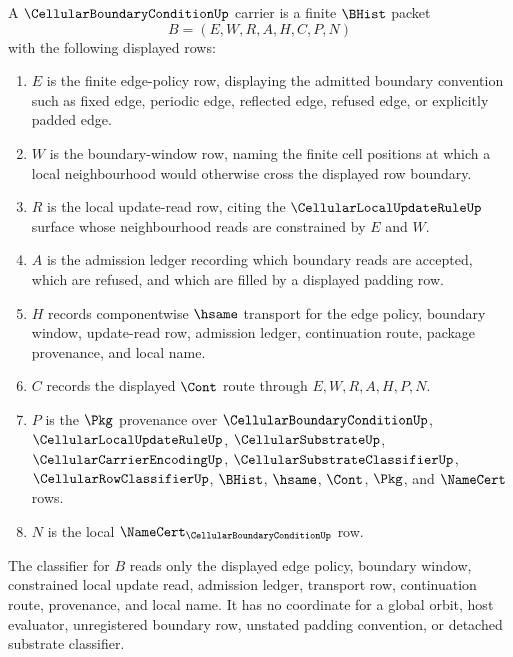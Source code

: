 \begin{definition}
\label{def:cellular-boundary-condition-carrier}
A $\CellularBoundaryConditionUp$ carrier is a finite $\BHist$ packet
$$
B=(E,W,R,A,H,C,P,N)
$$
with the following displayed rows:
\begin{enumerate}
\item $E$ is the finite edge-policy row, displaying the admitted boundary convention such as fixed edge, periodic edge, reflected edge, refused edge, or explicitly padded edge.
\item $W$ is the boundary-window row, naming the finite cell positions at which a local neighbourhood would otherwise cross the displayed row boundary.
\item $R$ is the local update-read row, citing the $\CellularLocalUpdateRuleUp$ surface whose neighbourhood reads are constrained by $E$ and $W$.
\item $A$ is the admission ledger recording which boundary reads are accepted, which are refused, and which are filled by a displayed padding row.
\item $H$ records componentwise $\hsame$ transport for the edge policy, boundary window, update-read row, admission ledger, continuation route, package provenance, and local name.
\item $C$ records the displayed $\Cont$ route through $E,W,R,A,H,P,N$.
\item $P$ is the $\Pkg$ provenance over $\CellularBoundaryConditionUp$, $\CellularLocalUpdateRuleUp$, $\CellularSubstrateUp$, $\CellularCarrierEncodingUp$, $\CellularSubstrateClassifierUp$, $\CellularRowClassifierUp$, $\BHist$, $\hsame$, $\Cont$, $\Pkg$, and $\NameCert$ rows.
\item $N$ is the local $\NameCert_{\CellularBoundaryConditionUp}$ row.
\end{enumerate}
The classifier for $B$ reads only the displayed edge policy, boundary window, constrained local update read, admission ledger, transport row, continuation route, provenance, and local name. It has no coordinate for a global orbit, host evaluator, unregistered boundary row, unstated padding convention, or detached substrate classifier.
\end{definition}

